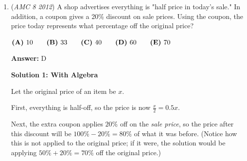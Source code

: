 \begin{enumerate}
 



\textbf{Solution 2}

Isabella needs to lose a max of $20$. When she got $97$ and $91$, the max goes down to $20 - 3 - 9 = 8$. If we get $100$ on her last test, then she will get $\boxed{\textbf{(B)}\ 92}$ on the third test.

 



\textbf{Solution 3}

Let the sum of the first three test scores be $x$. If it's still possible to get an average of 95 after the third test, then the lowest score possible would be 

 
 \[\frac{x + 100} {4} = 95.\] 

 Then, solving the equation, we get 

 
 \[x = 280.\] 

 Given that the previous test scores are $97$ and $91$, we can subtract those score from it, which would give that the lowest score possible for the test is 

 
 \[280 - 97 - 91 = \boxed{\textbf{(B)}\ 92}\]



	\item (\textit{AMC 8 2012}) A shop advertises everything is "half price in today's sale." In addition, a coupon gives a 20\% discount on sale prices. Using the coupon, the price today represents what percentage off the original price?


 $\textbf{(A)}\hspace{.05in}10\qquad\textbf{(B)}\hspace{.05in}33\qquad\textbf{(C)}\hspace{.05in}40\qquad\textbf{(D)}\hspace{.05in}60\qquad\textbf{(E)}\hspace{.05in}70$

 \textbf{Answer: }D



\textbf{Solution 1: With Algebra}

Let the original price of an item be $x$.

 First, everything is half-off, so the price is now $\frac{x}{2} = 0.5x$.

 Next, the extra coupon applies $20\%$ off on the \textit{sale price}, so the price after this discount will be $100\% - 20\% = 80\%$ of what it was before. (Notice how this is not applied to the original price; if it were, the solution would be applying $50\% + 20\% = 70\%$ off the original price.)


\end{enumerate}
